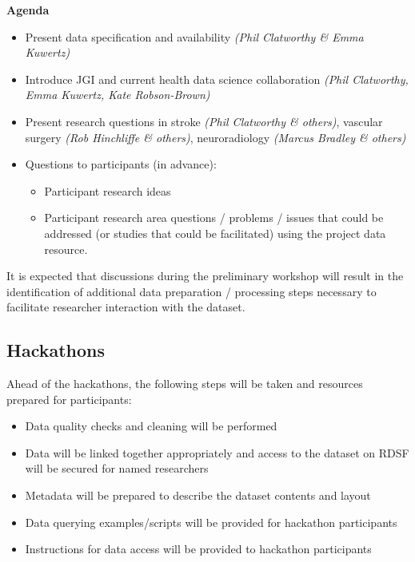 \documentclass{article}
\begin{document}
\textbf{Agenda}
\begin{itemize}
\item    Present data specification and availability \textit{(Phil
    Clatworthy \& Emma Kuwertz)}
\item    Introduce JGI and current health data science collaboration \textit{(Phil
    Clatworthy, Emma Kuwertz, Kate Robson-Brown)}
\item    Present research questions in stroke \textit{(Phil
    Clatworthy \& others)}, vascular surgery \textit{(Rob Hinchliffe
    \& others)},
  neuroradiology \textit{(Marcus Bradley \& others)}
\item Questions to participants (in advance):
  \begin{itemize}
  \item Participant research ideas
  \item Participant research area questions / problems / issues that
    could be addressed (or studies that could be facilitated) using
    the project data resource.
  \end{itemize}
\end{itemize}

It is expected that discussions during the preliminary workshop will
result in the identification of additional data preparation /
processing steps necessary to facilitate researcher interaction with
the dataset.\\

\subsection{Hackathons}

Ahead of the hackathons, the following steps will be
taken and resources
prepared for participants:

\begin{itemize}
\item Data quality checks and cleaning will be performed
\item Data will be linked together appropriately and access to the
  dataset on RDSF will be secured for named researchers
\item Metadata will be prepared to describe the dataset contents and layout
\item Data querying examples/scripts will be provided for hackathon participants
\item Instructions for data access will be provided to hackathon participants
\end{itemize}
\end{document}
